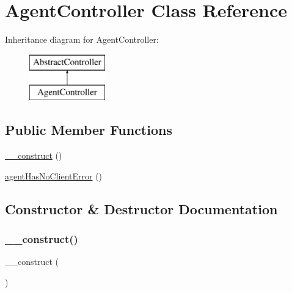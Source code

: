 \hypertarget{class_app_1_1_controller_1_1_agent_controller}{}\section{Agent\+Controller Class Reference}
\label{class_app_1_1_controller_1_1_agent_controller}
Inheritance diagram for Agent\+Controller\+:\begin{figure}[H]
\begin{center}
\leavevmode
\includegraphics[height=2.000000cm]{class_app_1_1_controller_1_1_agent_controller}
\end{center}
\end{figure}
\subsection*{Public Member Functions}
\begin{DoxyCompactItemize}
\item 
\mbox{\hyperlink{class_app_1_1_controller_1_1_agent_controller_a095c5d389db211932136b53f25f39685}{\+\_\+\+\_\+construct}} ()
\item 
\mbox{\hyperlink{class_app_1_1_controller_1_1_agent_controller_add4a55ab0d4320e648f20eeaf9e16879}{agent\+Has\+No\+Client\+Error}} ()
\end{DoxyCompactItemize}


\subsection{Constructor \& Destructor Documentation}
\mbox{\label{class_app_1_1_controller_1_1_agent_controller_a095c5d389db211932136b53f25f39685}} 
\subsubsection{\texorpdfstring{\_\_construct()}{\_\_construct()}}
{\footnotesize\ttfamily \+\_\+\+\_\+construct (\begin{DoxyParamCaption}{ }\end{DoxyParamCaption})}

